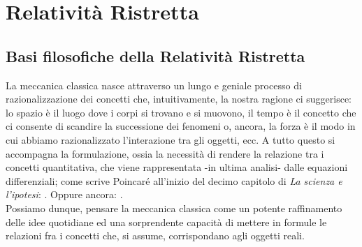 \section{Relatività Ristretta}\label{sec:1}
\subsection{Basi filosofiche della Relatività Ristretta}
La meccanica classica nasce attraverso un lungo e geniale processo di razionalizzazione dei concetti che, intuitivamente, la nostra ragione ci suggerisce: lo spazio è il luogo dove i corpi si trovano e si muovono, il tempo è il concetto che ci consente di scandire la successione dei fenomeni o, ancora, la forza è il modo in cui abbiamo razionalizzato l'interazione tra gli oggetti, ecc. A tutto questo si accompagna la formulazione, ossia la necessità di rendere la relazione tra i concetti quantitativa, che viene rappresentata -in ultima analisi- dalle equazioni differenziali; come scrive Poincaré all'inizio del decimo capitolo di \textit{La scienza e l'ipotesi}: . Oppure ancora: .\\
Possiamo dunque, pensare la meccanica classica come un potente raffinamento delle idee quotidiane ed una sorprendente capacità di mettere in formule le relazioni fra i concetti che, si assume, corrispondano agli oggetti reali.

